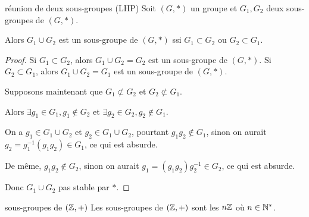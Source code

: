 \begin{proposition}{réunion de deux sous-groupes (LHP)}{}
    Soit $(G, \ast)$ un groupe et $G_1, G_2$ deux sous-groupes de $(G, \ast)$.

    Alors $G_1 \cup G_2$ est un sous-groupe de $(G, \ast)$ ssi $G_1 \subset G_2$ ou $G_2 \subset G_1$.
\end{proposition}

\begin{proof}
    Si $G_1 \subset G_2$, alors $G_1 \cup G_2 = G_2$ est un sous-groupe de $(G, \ast)$.
    Si $G_2 \subset G_1$, alors $G_1 \cup G_2 = G_1$ est un sous-groupe de $(G, \ast)$.

    \avspace Supposons maintenant que $G_1 \not \subset G_2$ et $G_2 \not \subset G_1$.

    Alors $\exists g_1 \in G_1, g_1 \not \in G_2$ et $\exists g_2 \in G_2, g_2 \not \in G_1$.

    On a $g_1 \in G_1 \cup G_2$ et $g_2 \in G_1 \cup G_2$, pourtant $g_1 g_2 \not \in G_1$, 
    sinon on aurait $g_2 = g_1^{-1} (g_1 g_2) \in G_1$, ce qui est absurde.

    De même, $g_1 g_2 \not \in G_2$, sinon on aurait $g_1 = (g_1 g_2) g_2^{-1} \in G_2$, ce qui est absurde.

    Donc $G_1 \cup G_2$ pas stable par $\ast$. 
\end{proof}

\begin{theoreme}{sous-groupes de $(\mathbb{Z}, +)$}{}
    Les sous-groupes de $(\mathbb{Z}, +)$ sont les $n\mathbb{Z}$ où $n \in \mathbb{N}^*$.
    
\end{theoreme}


